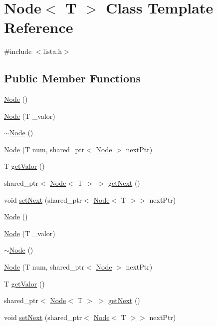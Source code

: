 \hypertarget{classNode}{\section{Node$<$ T $>$ Class Template Reference}
\label{classNode}
}


{\ttfamily \#include $<$lista.\-h$>$}

\subsection*{Public Member Functions}
\begin{DoxyCompactItemize}
\item 
\hyperlink{classNode_a0ac1d44cfe588be564acf25485029bd8}{Node} ()
\item 
\hyperlink{classNode_ae00c7c803c5b2fea3b2270050da4a9db}{Node} (T \-\_\-valor)
\item 
\hyperlink{classNode_ae923d0417581dd19784d55b901f0f7f0}{$\sim$\-Node} ()
\item 
\hyperlink{classNode_af67f09d322ec9a1fc2852ff98f0a4558}{Node} (T num, shared\-\_\-ptr$<$ \hyperlink{classNode}{Node} $>$ next\-Ptr)
\item 
T \hyperlink{classNode_aac9fa54166ff3aa269de6da8f9484f66}{get\-Valor} ()
\item 
shared\-\_\-ptr$<$ \hyperlink{classNode}{Node}$<$ T $>$ $>$ \hyperlink{classNode_a85f16577c580d8fdc246f350c5a6141a}{get\-Next} ()
\item 
void \hyperlink{classNode_a73ec6e581244130c98a26ed2935cf472}{set\-Next} (shared\-\_\-ptr$<$ \hyperlink{classNode}{Node}$<$ T $>$$>$ next\-Ptr)
\item 
\hyperlink{classNode_a0ac1d44cfe588be564acf25485029bd8}{Node} ()
\item 
\hyperlink{classNode_ae00c7c803c5b2fea3b2270050da4a9db}{Node} (T \-\_\-valor)
\item 
\hyperlink{classNode_ae923d0417581dd19784d55b901f0f7f0}{$\sim$\-Node} ()
\item 
\hyperlink{classNode_af67f09d322ec9a1fc2852ff98f0a4558}{Node} (T num, shared\-\_\-ptr$<$ \hyperlink{classNode}{Node} $>$ next\-Ptr)
\item 
T \hyperlink{classNode_aac9fa54166ff3aa269de6da8f9484f66}{get\-Valor} ()
\item 
shared\-\_\-ptr$<$ \hyperlink{classNode}{Node}$<$ T $>$ $>$ \hyperlink{classNode_a37c5665dd57486ac568959cd347e0187}{get\-Next} ()
\item 
void \hyperlink{classNode_a73ec6e581244130c98a26ed2935cf472}{set\-Next} (shared\-\_\-ptr$<$ \hyperlink{classNode}{Node}$<$ T $>$$>$ next\-Ptr)
\end{DoxyCompactItemize}

